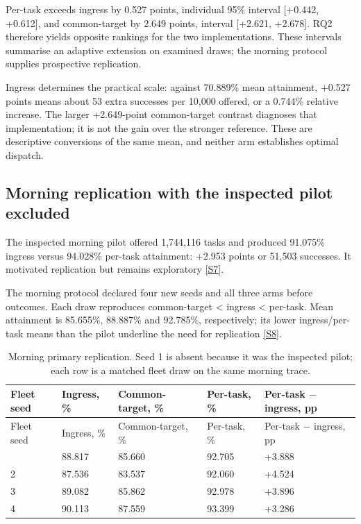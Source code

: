 \documentclass[11pt,a4paper]{article}
\begin{document}
Per-task exceeds ingress by 0.527 points, individual 95\% interval [+0.442, +0.612], and common-target by 2.649 points, interval [+2.621, +2.678]. RQ2 therefore yields opposite rankings for the two implementations. These intervals summarise an adaptive extension on examined draws; the morning protocol supplies prospective replication.

Ingress determines the practical scale: against 70.889\% mean attainment, +0.527 points means about 53 extra successes per 10,000 offered, or a 0.744\% relative increase. The larger +2.649-point common-target contrast diagnoses that implementation; it is not the gain over the stronger reference. These are descriptive conversions of the same mean, and neither arm establishes optimal dispatch.

\subsection{Morning replication with the inspected pilot excluded}\label{sec:3.3}

The inspected morning pilot offered 1,744,116 tasks and produced 91.075\% ingress versus 94.028\% per-task attainment: +2.953 points or 51,503 successes. It motivated replication but remains exploratory \hyperref[source-s7]{[S7]}.

The morning protocol declared four new seeds and all three arms before outcomes. Each draw reproduces common-target < ingress < per-task. Mean attainment is 85.655\%, 88.887\% and 92.785\%, respectively; its lower ingress/per-task means than the pilot underline the need for replication \hyperref[source-s8]{[S8]}.

\begingroup
\small
\begin{xltabular}{\textwidth}{@{}YYYYY@{}}
\caption{Morning primary replication. Seed 1 is absent because it was the inspected pilot; each row is a matched fleet draw on the same morning trace.}\label{tab:5} \\
\toprule
Fleet seed & Ingress, \% & Common-target, \% & Per-task, \% & Per-task \ensuremath{-} ingress, pp \\
\midrule\endfirsthead
\toprule
Fleet seed & Ingress, \% & Common-target, \% & Per-task, \% & Per-task \ensuremath{-} ingress, pp \\
\midrule\endhead
\bottomrule{} & 88.817 & 85.660 & 92.705 & +3.888 \\
2 & 87.536 & 83.537 & 92.060 & +4.524 \\
3 & 89.082 & 85.862 & 92.978 & +3.896 \\
4 & 90.113 & 87.559 & 93.399 & +3.286 \\
\end{xltabular}
\endgroup
\end{document}
